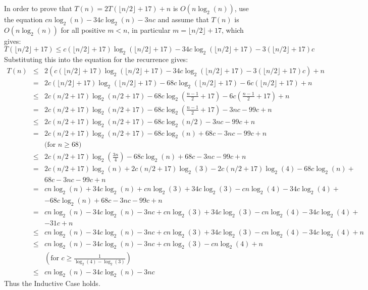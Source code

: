 In order to prove that $T(n) = 2T(\lfloor n / 2 \rfloor + 17) + n$ is $O(n \log_2(n))$, use the equation $cn\log_2(n) - 34c\log_2(n) - 3nc$ and assume that $T(n)$ is $O(n\log_2(n))$ for all positive $m < n$, in particular $m = \lfloor n / 2 \rfloor + 17$, which gives:
\begin{equation*}
	T(\lfloor n / 2 \rfloor + 17) \leq c (\lfloor n / 2 \rfloor + 17)\log_2(\lfloor n / 2 \rfloor + 17) - 34c\log_2(\lfloor n /2 \rfloor + 17) - 3(\lfloor n / 2 \rfloor + 17)c
\end{equation*}
Substituting this into the equation for the recurrence gives:
\begin{eqnarray*}
	T(n) &\leq& 2(c(\lfloor n / 2 \rfloor + 17)\log_2(\lfloor n / 2 \rfloor + 17) - 34c\log_2(\lfloor n / 2 \rfloor + 17) - 3(\lfloor n / 2 \rfloor + 17)c) + n \\
	 &=& 2c(\lfloor n / 2 \rfloor + 17)\log_2(\lfloor n / 2 \rfloor + 17) - 68c\log_2(\lfloor n / 2 \rfloor + 17) - 6c(\lfloor n / 2 \rfloor + 17) + n \\
	 &\leq& 2c(n / 2 + 17)\log_2(n / 2 + 17) - 68c\log_2\left(\frac{n - 1}{2} + 17\right) - 6c\left(\frac{n - 1}{2} + 17\right) + n \\
	 &=& 2c(n / 2 + 17)\log_2(n / 2 + 17) - 68c\log_2\left(\frac{n - 1}{2} + 17\right) - 3nc - 99c + n \\
	 &\leq& 2c(n / 2 + 17)\log_2(n / 2 + 17) - 68c\log_2(n/2) - 3nc - 99c + n \\
	 &=& 2c(n / 2 + 17)\log_2(n / 2 + 17) - 68c\log_2(n) + 68c - 3nc -99c + n \\
	 &&\text{(for $n \geq 68$)} \\
	 &\leq& 2c(n / 2 + 17)\log_2\left(\frac{3n}{4}\right) - 68c\log_2(n) + 68c - 3nc - 99c + n \\
	 &=& 2c(n / 2 + 17)\log_2(n) + 2c(n / 2 + 17)\log_2(3) - 2c(n / 2 + 17)\log_2(4) - 68c\log_2(n) + \\
	 && 68c - 3nc - 99c + n \\
	 &=& cn\log_2(n) + 34c\log_2(n) + cn\log_2(3) + 34c\log_2(3) - cn\log_2(4) - 34c\log_2(4) + \\
	 && - 68c\log_2(n) + 68c - 3nc - 99c + n \\
	 &=& cn\log_2(n) - 34c\log_2(n) - 3nc + cn\log_2(3) + 34c\log_2(3) - cn\log_2(4) - 34c\log_2(4) + \\
	 && - 31c + n \\
	 &\leq& cn\log_2(n) - 34c\log_2(n) - 3nc + cn\log_2(3) + 34c\log_2(3) - cn\log_2(4) - 34c\log_2(4) + n \\
	 &\leq& cn\log_2(n) - 34c\log_2(n) - 3nc + cn\log_2(3) - cn\log_2(4) + n \\
	 &&\left(\text{for } c \geq \frac{1}{\log_2(4) - \log_2(3)}\right) \\
	 &\leq& cn\log_2(n) - 34c\log_2(n) - 3nc
\end{eqnarray*}
Thus the Inductive Case holds.

